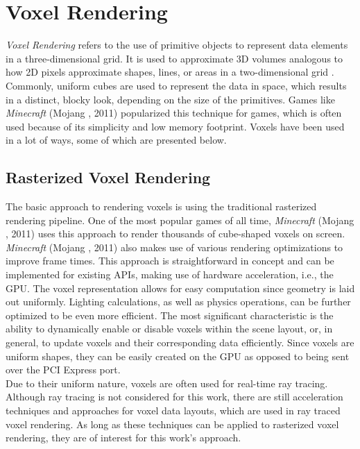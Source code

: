 \section{Voxel Rendering} \label{sec-voxel-rendering}

\noindent
\emph{Voxel Rendering} refers to the use of primitive objects to represent data elements in a three-dimensional 
grid. It is used to approximate 3D volumes analogous to how 2D pixels approximate shapes, lines, or areas in a 
two-dimensional grid \cite{MegaVoxels2023}. Commonly, uniform cubes are used to represent the data in space, 
which results in a distinct, blocky look, depending on the size of the primitives. Games like \emph{Minecraft} 
(Mojang \cite{Mojang2024}, 2011) popularized this technique for games, which is often used because of its 
simplicity and low memory footprint. Voxels have been used in a lot of ways, some of which are presented below.


\subsection*{Rasterized Voxel Rendering} \label{subsec-rasterized-voxel-rendering}

The basic approach to rendering voxels is using the traditional rasterized rendering pipeline.
One of the most popular games of all time, \emph{Minecraft} (Mojang \cite{Mojang2024}, 2011) uses 
this approach to render thousands of cube-shaped voxels on screen. \emph{Minecraft} (Mojang 
\cite{Mojang2024}, 2011) also makes use of various rendering optimizations to improve frame times. 
This approach is straightforward in concept and can be implemented for existing \ac{API}s, making 
use of hardware acceleration, i.e., the \ac{GPU}. The voxel representation allows for easy 
computation since geometry is laid out uniformly. Lighting calculations, as well as physics 
operations, can be further optimized to be even more efficient. The most significant characteristic 
is the ability to dynamically enable or disable voxels within the scene layout, or, in general, 
to update voxels and their corresponding data efficiently. Since voxels are uniform shapes, 
they can be easily created on the \ac{GPU} as opposed to being sent over the \ac{PCI Express} port. \\

\noindent
Due to their uniform nature, voxels are often used for real-time ray tracing. Although ray tracing 
is not considered for this work, there are still acceleration techniques and approaches for voxel 
data layouts, which are used in ray traced voxel rendering. As long as these techniques can be 
applied to rasterized voxel rendering, they are of interest for this work's approach.


